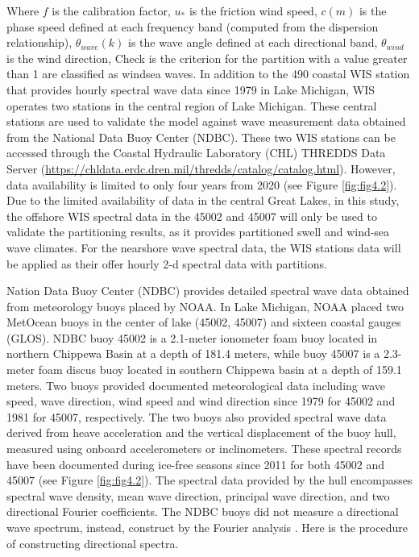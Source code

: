Where $f$ is the calibration factor,  $u_*$ is the friction wind speed, $c(m)$
is the phase speed defined at each frequency band (computed from the dispersion
relationship), $\theta_{wave}(k)$ is the wave angle defined at each directional
band, $\theta_{wind}$ is the wind direction, Check  is the criterion for the
partition with a value greater than 1 are classified as windsea waves. In
addition to the 490 coastal WIS station that provides hourly spectral wave data
since 1979 in Lake Michigan, WIS operates two stations in the central region of
Lake Michigan.  These central stations are used to validate the model against
wave measurement data obtained from the National Data Buoy Center (NDBC). These
two WIS stations can be accessed through the Coastal Hydraulic Laboratory (CHL)
THREDDS Data Server
(\url{https://chldata.erdc.dren.mil/thredds/catalog/catalog.html}). However,
data availability is limited to only four years from 2020 (see Figure
\ref{fig:fig4.2}). Due to the limited availability of data in the central Great
Lakes, in this study, the offshore WIS spectral data in the 45002 and 45007 will
only be used to validate the partitioning results, as it provides partitioned
swell and wind-sea wave climates. For the nearshore wave spectral data, the WIS
stations data will be applied as their offer hourly 2-d spectral data with
partitions.

Nation Data Buoy Center (NDBC) provides detailed spectral wave data obtained
from meteorology buoys placed by NOAA. In Lake Michigan, NOAA placed two
MetOcean buoys in the center of lake (45002, 45007) and sixteen coastal gauges
(GLOS). NDBC buoy 45002 is a 2.1-meter ionometer foam buoy located in northern
Chippewa Basin at a depth of 181.4 meters, while buoy 45007 is a 2.3-meter foam
discus buoy located in southern Chippewa basin at a depth of 159.1 meters. Two
buoys provided documented meteorological data including wave speed, wave
direction, wind speed and wind direction since 1979 for 45002 and 1981 for
45007, respectively. The two buoys also provided spectral wave data derived from
heave acceleration and the vertical displacement of the buoy hull, measured
using onboard accelerometers or inclinometers. These spectral records have been
documented during ice-free seasons since 2011 for both 45002 and 45007 (see
Figure \ref{fig:fig4.2}). The spectral data provided by the hull encompasses
spectral wave density, mean wave direction, principal wave direction, and two
directional Fourier coefficients. The NDBC buoys did not measure a directional
wave spectrum, instead, construct by the Fourier analysis
\citep{longuet-higgins_observations_1961}. Here is the procedure of constructing
directional spectra.

